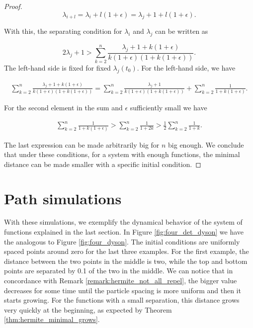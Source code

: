 \begin{proof}
    \begin{equation*}
         \lambda_{i+l} = \lambda_i + l(1+\epsilon) = \lambda_j + 1 + l(1+\epsilon).
    \end{equation*}

    With this, the separating condition for $\lambda_i$ and $\lambda_j$ can be written as

    \begin{equation*}
        2\lambda_j + 1 > \sum_{k=2}^{n} \frac{\lambda_j + 1 + k(1+\epsilon)}{k(1+\epsilon)(1+k(1+\epsilon))}. 
    \end{equation*}
    The left-hand side is fixed for fixed $\lambda_j(t_0)$. For the left-hand side, we have

    \begin{align*}
        \sum_{k=2}^{n} \frac{\lambda_j + 1 + k(1+\epsilon)}{k(1+\epsilon)(1+k(1+\epsilon))} = \sum_{k=2}^n \frac{\lambda_j + 1}{k(1+\epsilon)(1+k(1+\epsilon))} + \sum_{k=2}^n \frac{1}{1+k(1+\epsilon)}.
    \end{align*}

    For the second element in the sum and $\epsilon$ sufficiently small we have 

    \begin{align*}
        \sum_{k=2}^n \frac{1}{1+k(1+\epsilon)} > \sum_{k=2}^n \frac{1}{1+2k} > \frac12\sum_{k=2}^n \frac{1}{1+k}.
    \end{align*}

    The last expression can be made arbitrarily big for $n$ big enough. We conclude that under these conditions, for a system with enough functions, the minimal distance can be made smaller with a specific initial condition.
    
\end{proof}


\section{Path simulations}

With these simulations, we exemplify the dynamical behavior of the system of functions explained in the last section. In Figure \ref{fig:four_det_dyson} we have the analogous to Figure \ref{fig:four_dyson}. The initial conditions are uniformly spaced points around zero for the last three examples. For the first example, the distance between the two points in the middle is two, while the top and bottom points are separated by 0.1 of the two in the middle. We can notice that in concordance with Remark \ref{remark:hermite_not_all_repel}, the bigger value decreases for some time until the particle spacing is more uniform and then it starts growing. For the functions with a small separation, this distance grows very quickly at the beginning, as expected by Theorem \ref{thm:hermite_minimal_grows}.



